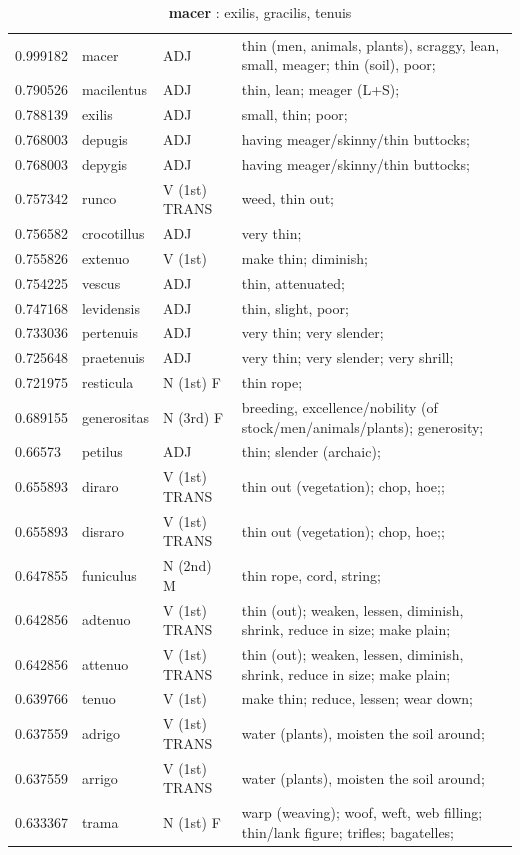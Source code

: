 \documentclass[]{article}
\begin{document}
	\begin{table}
	\caption{\textbf{macer} : exilis, gracilis, tenuis \label{macer}}
	\vspace{.25in}
	\begin{tabular}{l|lll}
	   0.999182 & macer & ADJ & thin (men, animals, plants), scraggy, lean, small, meager; thin (soil), poor;\\
	   0.790526 & macilentus & ADJ & thin, lean; meager (L+S);\\
	   0.788139 & exilis & ADJ & small, thin; poor;\\
	   0.768003 & depugis & ADJ & having meager/skinny/thin buttocks;\\
	   0.768003 & depygis & ADJ & having meager/skinny/thin buttocks;\\
	   0.757342 & runco & V (1st) TRANS & weed, thin out;\\
	   0.756582 & crocotillus & ADJ & very thin;\\
	   0.755826 & extenuo & V (1st) & make thin; diminish;\\
	   0.754225 & vescus & ADJ & thin, attenuated;\\
	   0.747168 & levidensis & ADJ & thin, slight, poor;\\
	   0.733036 & pertenuis & ADJ & very thin; very slender;\\
	   0.725648 & praetenuis & ADJ & very thin; very slender; very shrill;\\
	   0.721975 & resticula & N (1st) F & thin rope;\\
	   0.689155 & generositas & N (3rd) F & breeding, excellence/nobility (of stock/men/animals/plants); generosity;\\
	   0.66573 & petilus & ADJ & thin; slender (archaic);\\
	   0.655893 & diraro & V (1st) TRANS & thin out (vegetation); chop, hoe;;\\
	   0.655893 & disraro & V (1st) TRANS & thin out (vegetation); chop, hoe;;\\
	   0.647855 & funiculus & N (2nd) M & thin rope, cord, string;\\
	   0.642856 & adtenuo & V (1st) TRANS & thin (out); weaken, lessen, diminish, shrink, reduce in size; make plain;\\
	   0.642856 & attenuo & V (1st) TRANS & thin (out); weaken, lessen, diminish, shrink, reduce in size; make plain;\\
	   0.639766 & tenuo & V (1st) & make thin; reduce, lessen; wear down;\\
	   0.637559 & adrigo & V (1st) TRANS & water (plants), moisten the soil around;\\
	   0.637559 & arrigo & V (1st) TRANS & water (plants), moisten the soil around;\\
	   0.633367 & trama & N (1st) F & warp (weaving); woof, weft, web filling; thin/lank figure; trifles; bagatelles;\\
	\end{tabular}
	\end{table}
\end{document}
